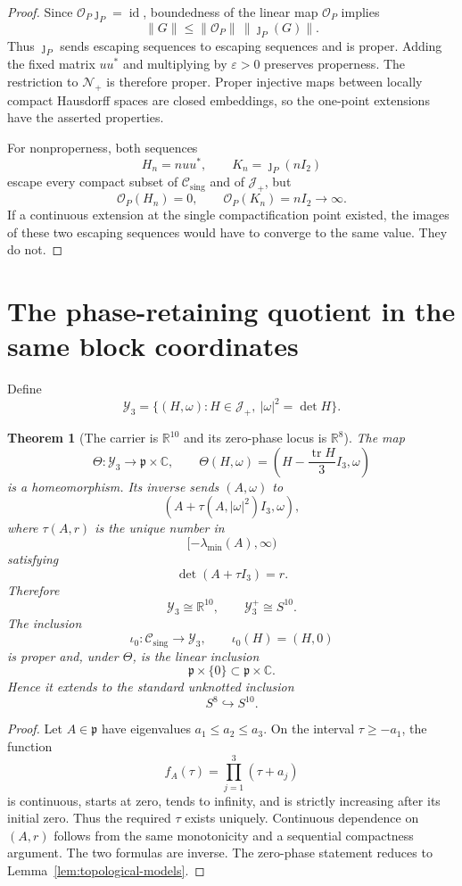 \documentclass[11pt]{article}
\newtheorem{theorem}{Theorem}[section]
\theoremstyle{definition}
\newcommand{\C}{\mathbb C}
\newcommand{\R}{\mathbb R}
\newcommand{\tr}{\operatorname{tr}}
\newcommand{\id}{\operatorname{id}}
\newcommand{\Jp}{\mathcal J_+}
\newcommand{\Np}{\mathcal N_+}
\newcommand{\Cs}{\mathcal C_{\mathrm{sing}}}
\newcommand{\Y}{\mathcal Y_3}
\begin{document}
\begin{proof}
Since $\mathcal O_P\jmath_P=\id$, boundedness of the linear map $\mathcal O_P$ implies
\[
 \|G\|\leq\|\mathcal O_P\|\,\|\jmath_P(G)\|.
\]
Thus $\jmath_P$ sends escaping sequences to escaping sequences and is proper.  Adding the fixed matrix $uu^*$ and multiplying by $\varepsilon>0$ preserves properness.  The restriction to $\Np$ is therefore proper.  Proper injective maps between locally compact Hausdorff spaces are closed embeddings, so the one-point extensions have the asserted properties.

For nonproperness, both sequences
\[
 H_n=n uu^*,
 \qquad
 K_n=\jmath_P(nI_2)
\]
escape every compact subset of $\Cs$ and of $\Jp$, but
\[
 \mathcal O_P(H_n)=0,
 \qquad
 \mathcal O_P(K_n)=nI_2\longrightarrow\infty.
\]
If a continuous extension at the single compactification point existed, the images of these two escaping sequences would have to converge to the same value.  They do not.
\end{proof}

\section{The phase-retaining quotient in the same block coordinates}

Define
\[
 \Y=\{(H,\omega):H\in\Jp,\ |\omega|^2=\det H\}.
\]

\begin{theorem}[The carrier is $\R^{10}$ and its zero-phase locus is $\R^8$]\label{thm:Ytopology}
The map
\[
 \Theta:\Y\longrightarrow\mathfrak p\times\C,
 \qquad
 \Theta(H,\omega)=\left(H-\frac{\tr H}{3}I_3,\omega\right)
\]
is a homeomorphism.  Its inverse sends $(A,\omega)$ to
\[
 \left(A+\tau(A,|\omega|^2)I_3,\omega\right),
\]
where $\tau(A,r)$ is the unique number in
\[
 [-\lambda_{\min}(A),\infty)
\]
satisfying
\[
 \det(A+\tau I_3)=r.
\]
Therefore
\[
 \boxed{\Y\cong\R^{10},\qquad \Y^+\cong S^{10}.}
\]
The inclusion
\[
 \iota_0:\Cs\longrightarrow\Y,
 \qquad
 \iota_0(H)=(H,0)
\]
is proper and, under $\Theta$, is the linear inclusion
\[
 \mathfrak p\times\{0\}\subset\mathfrak p\times\C.
\]
Hence it extends to the standard unknotted inclusion
\[
 \boxed{S^8\hookrightarrow S^{10}.}
\]
\end{theorem}

\begin{proof}
Let $A\in\mathfrak p$ have eigenvalues $a_1\leq a_2\leq a_3$.  On the interval $\tau\geq-a_1$, the function
\[
 f_A(\tau)=\prod_{j=1}^3(\tau+a_j)
\]
is continuous, starts at zero, tends to infinity, and is strictly increasing after its initial zero.  Thus the required $\tau$ exists uniquely.  Continuous dependence on $(A,r)$ follows from the same monotonicity and a sequential compactness argument.  The two formulas are inverse.  The zero-phase statement reduces to Lemma~\ref{lem:topological-models}.
\end{proof}
\end{document}
